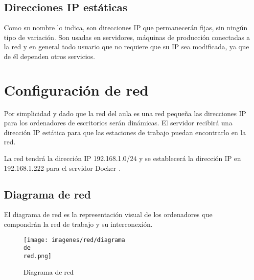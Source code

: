 			
		\subsection{Direcciones IP estáticas}\par
			
			Como su nombre lo indica, son direcciones IP que permanecerán fijas, sin ningún tipo de variación. Son usadas en servidores, máquinas de producción conectadas a la red y en general todo usuario que no requiere que su IP sea modificada, ya que de él dependen otros servicios.
	
			
	\section{Configuración de red}	
	
		Por simplicidad y dado que la red del aula es una red pequeña las direcciones IP para los ordenadores de escritorios serán dinámicas. El servidor recibirá una dirección IP estática para que las estaciones de trabajo puedan encontrarlo en la red.\par
	
		La red tendrá la dirección IP 192.168.1.0/24 y se establecerá la dirección IP en 192.168.1.222 para el servidor Docker .\par
		
		\subsection{Diagrama de red}
				
			El diagrama de red es la representación visual de los ordenadores que compondrán la red de trabajo y su interconexión.\par
			
			\begin{figure}[h]
				\centering
				\texttt{[image: imagenes/red/diagrama\\ de\\ red.png]}
				\caption{Diagrama de red}
				\label{fig:red lan}
			\end{figure}
			
				
